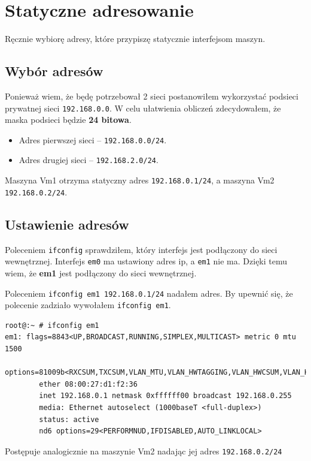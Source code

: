 \documentclass{mwart} %
\begin{document}
\section{Statyczne adresowanie}
Ręcznie wybiorę adresy, które przypiszę statycznie interfejsom maszyn.

\subsection{Wybór adresów}
Ponieważ wiem, że będę potrzebował 2 sieci postanowiłem wykorzystać podsieci prywatnej sieci \texttt{192.168.0.0}. W celu ułatwienia obliczeń zdecydowałem, że maska podsieci będzie \textbf{24 bitowa}.

\begin{itemize}
  \item Adres pierwszej sieci -- \texttt{192.168.0.0/24}.
  \item Adres drugiej sieci -- \texttt{192.168.2.0/24}.
\end{itemize}

Maszyna Vm1 otrzyma statyczny adres \texttt{192.168.0.1/24}, a maszyna Vm2 \texttt{192.168.0.2/24}.

\subsection{Ustawienie adresów}
Poleceniem \texttt{ifconfig} sprawdziłem, który interfejs jest podłączony do sieci wewnętrznej. Interfejs \texttt{em0} ma ustawiony adres ip, a \texttt{em1} nie ma. Dzięki temu wiem, że \textbf{em1} jest podłączony do sieci wewnętrznej.

Poleceniem \texttt{ifconfig em1 192.168.0.1/24} nadałem adres. By upewnić się, że polecenie zadziało wywołałem \texttt{ifconfig em1}.

\begin{verbatim}
root@:~ # ifconfig em1
em1: flags=8843<UP,BROADCAST,RUNNING,SIMPLEX,MULTICAST> metric 0 mtu 1500
        options=81009b<RXCSUM,TXCSUM,VLAN_MTU,VLAN_HWTAGGING,VLAN_HWCSUM,VLAN_HWFILTER>
        ether 08:00:27:d1:f2:36
        inet 192.168.0.1 netmask 0xffffff00 broadcast 192.168.0.255
        media: Ethernet autoselect (1000baseT <full-duplex>)
        status: active
        nd6 options=29<PERFORMNUD,IFDISABLED,AUTO_LINKLOCAL>
\end{verbatim}

Postępuje analogicznie na maszynie Vm2 nadając jej adres \texttt{192.168.0.2/24}
\end{document}
